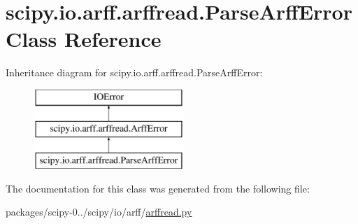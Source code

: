 \hypertarget{classscipy_1_1io_1_1arff_1_1arffread_1_1ParseArffError}{}\section{scipy.\+io.\+arff.\+arffread.\+Parse\+Arff\+Error Class Reference}
\label{classscipy_1_1io_1_1arff_1_1arffread_1_1ParseArffError}
Inheritance diagram for scipy.\+io.\+arff.\+arffread.\+Parse\+Arff\+Error\+:\begin{figure}[H]
\begin{center}
\leavevmode
\includegraphics[height=3.000000cm]{classscipy_1_1io_1_1arff_1_1arffread_1_1ParseArffError}
\end{center}
\end{figure}


The documentation for this class was generated from the following file\+:\begin{DoxyCompactItemize}
\item 
packages/scipy-\/0../scipy/io/arff/\hyperlink{arffread_8py}{arffread.\+py}\end{DoxyCompactItemize}
